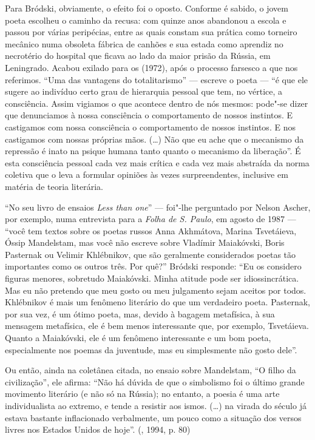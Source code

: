 {Para Bródski, obviamente, o efeito foi o oposto. Conforme é sabido, o jovem
poeta escolheu o caminho da recusa: com quinze anos abandonou a escola
e passou por várias peripécias, entre as quais constam sua prática como
torneiro mecânico numa obsoleta fábrica de canhões e sua estada como aprendiz no
necrotério do hospital que ficava ao lado da maior prisão da Rússia, em
Leningrado. Acabou exilado para os  (1972), após o processo
farsesco a que nos referimos. ``Uma das vantagens do totalitarismo'' ---
escreve o poeta --- ``é que ele sugere ao indivíduo certo grau de
hierarquia pessoal que tem, no vértice, a consciência. Assim vigiamos o
que acontece dentro de nós mesmos: pode"-se dizer que denunciamos à nossa
consciência o comportamento de nossos instintos. E castigamos com nossa
consciência o comportamento de nossos instintos. E nos castigamos com
nossas próprias mãos. (\ldots{}) Não que eu ache que o mecanismo da repressão
é inato na psique humana tanto quanto o mecanismo da liberação''. É esta
consciência pessoal cada vez mais crítica e cada vez mais abstraída da
norma coletiva que o leva a formular opiniões às vezes surpreendentes,
inclusive em matéria de teoria literária.

``No seu livro de ensaios \emph{Less than one}'' --- foi"-lhe perguntado
por Nelson Ascher, por exemplo, numa entrevista para a \emph{Folha de S. Paulo},
em agosto de 1987 --- ``você tem textos sobre os poetas russos Anna
Akhmátova, Marina Tsvetáieva, Óssip Mandelstam, mas você não escreve
sobre Vladímir Maiakóvski, Boris Pasternak ou Velimir Khlébnikov, que
são geralmente considerados poetas tão importantes como os outros três.
Por quê?'' Bródski responde: ``Eu os considero figuras menores, sobretudo Maiakóvski. Minha
atitude pode ser idiossincrática. Mas eu não pretendo que meu gosto ou
meu julgamento sejam aceitos por todos. Khlébnikov é mais um fenômeno
literário do que um verdadeiro poeta. Pasternak, por sua vez, é um ótimo
poeta, mas, devido à bagagem metafísica, à sua mensagem metafísica, ele é
bem menos interessante que, por exemplo, Tsvetáieva. Quanto a
Maiakóvski, ele é um fenômeno interessante e um bom poeta, especialmente
nos poemas da juventude, mas eu simplesmente não gosto dele''.

Ou então, ainda na coletânea citada, no ensaio sobre Mandelstam, ``O filho da civilização'', ele
afirma: ``Não há dúvida de que o simbolismo foi o último grande movimento literário (e não
só na Rússia); no entanto, a poesia é uma arte
individualista ao extremo, e tende a resistir aos ismos. (\ldots{}) na virada do século já 
estava bastante inflacionado verbalmente, um pouco como a situação
 dos versos livres nos Estados Unidos de hoje''. (, 
1994, p. 80) 

}
